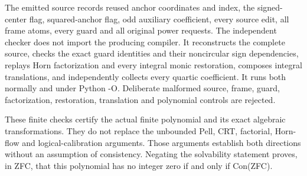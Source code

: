 The emitted source records reused anchor coordinates and index, the signed-center flag, squared-anchor flag, odd auxiliary coefficient, every source edit, all frame atoms, every guard and all original power requests. The independent checker does not import the producing compiler. It reconstructs the complete source, checks the exact guard identities and their noncircular sign dependencies, replays Horn factorization and every integral monic restoration, composes integral translations, and independently collects every quartic coefficient. It runs both normally and under Python -O. Deliberate malformed source, frame, guard, factorization, restoration, translation and polynomial controls are rejected.



These finite checks certify the actual finite polynomial and its exact algebraic transformations. They do not replace the unbounded Pell, CRT, factorial, Horn-flow and logical-calibration arguments. Those arguments establish both directions without an assumption of consistency. Negating the solvability statement proves, in ZFC, that this polynomial has no integer zero if and only if Con(ZFC).
